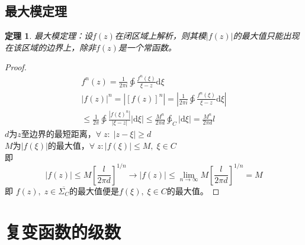 \documentclass[10pt, a4paper, oneside]{ctexbook}
\newtheorem{theorem}{定理}[section]
\def\D{\mathrm{d}}
\newcommand{\F}[1][z]
{\ensuremath{f(#1)}}
\begin{document}
\section{最大模定理}
\begin{theorem}
    最大模定理：设$\F$在闭区域上解析，则其模$|\F|$的最大值只能出现在该区域的边界上，除非$\F$是一个常函数。
\end{theorem}
\begin{proof}
    \begin{align*}
        f^n(z)=\frac{1}{2\pi i} \ointctrclockwise \frac{f^n(\xi)}{\xi-z}\D \xi                                  \\
        |\F|^n=|\left[\F\right]^n|=\left|\frac{1}{2\pi i} \ointctrclockwise \frac{f^n(\xi)}{\xi-z}\D \xi\right| \\ \le \frac{1}{2\pi} \ointctrclockwise \frac{|f(\xi)^n|}{|\xi-z|}|\D \xi|
        \le \frac{M^n}{2\pi d}\ointctrclockwise_C |\D \xi|=\frac{M^n}{2\pi d}l
    \end{align*}
    $d$为$z$至边界的最短距离，$\forall\; z:\;|z-\xi|\ge d$\\
    $M$为$|\F[\xi]|$的最大值，$\forall\; z:|f(\xi)|\le M,\;\xi\in C$\\
    即
    $$
        |\F|\le M\left[\frac{l}{2\pi d}\right]^{1/n}\to|\F|\le \lim_{n\to \infty} M\left[\frac{l}{2\pi d}\right]^{1/n}=M
    $$
    即
    $f(z),\;z\in \overline{\Sigma_C}$的最大值便是$f(\xi),\;\xi\in C$的最大值。
\end{proof}
\chapter{复变函数的级数}
\end{document}

